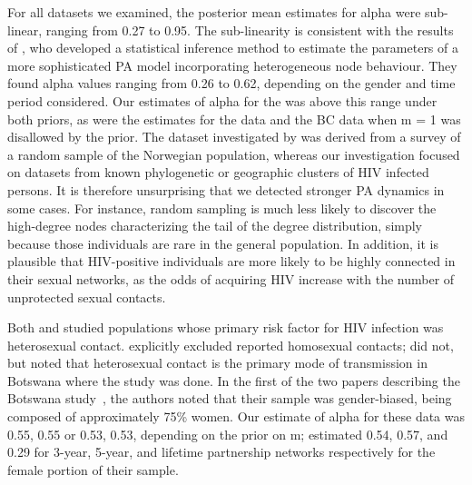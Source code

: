 For all datasets we examined, the posterior mean estimates for \gls{alpha} were
sub-linear, ranging from 
    0.27
to 
    0.95.
The sub-linearity is consistent with the results of
\textcite{de2007preferential}, who developed a statistical inference method to
estimate the parameters of a more sophisticated \acrlong{PA} model
incorporating heterogeneous node behaviour. They found \gls{alpha} values
ranging from 0.26 to 0.62, depending on the gender and time period considered. 
Our estimates of \gls{alpha} for the \textcite{niculescu2015recent} was above
this range under both priors, as were the estimates for the
\textcite{wang2015targeting} data and the BC data when \gls{m} = 1 was
disallowed by the prior. The dataset investigated by
\textcite{de2007preferential} was derived from a survey of a random sample of
the Norwegian population, whereas our investigation focused on datasets from
known phylogenetic or geographic clusters of \gls{HIV} infected persons. It is
therefore unsurprising that we detected stronger \acrlong{PA} dynamics in some
cases. For instance, random sampling is much less likely to discover the
high-degree nodes characterizing the tail of the degree distribution, simply
because those individuals are rare in the general population. In addition, it
is plausible that \gls{HIV}-positive individuals are more likely to be highly
connected in their sexual networks, as the odds of acquiring \gls{HIV} increase
with the number of unprotected sexual contacts.

Both \textcite{de2007preferential} and \textcite{novitsky2014impact} studied
populations whose primary risk factor for \gls{HIV} infection was heterosexual
contact. \citeauthor{de2007preferential} explicitly excluded reported
homosexual contacts; \citeauthor{novitsky2014impact} did not, but noted that
heterosexual contact is the primary mode of transmission in Botswana where the
study was done. In the first of the two papers describing the Botswana
study~\autocite{novitsky2013phylogenetic}, the authors noted that their sample
was gender-biased, being composed of approximately 75\% women. Our estimate of
\gls{alpha} for these data was 
    0.55, 0.55
        or 
    0.53, 0.53,
depending on the prior on \gls{m}; \citeauthor{de2007preferential} estimated
0.54, 0.57, and 0.29 for 3-year, 5-year, and lifetime partnership networks
respectively for the female portion of their sample.

